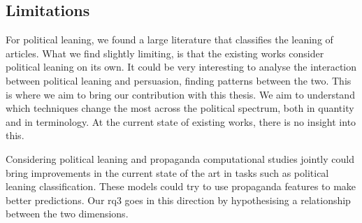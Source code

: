 







\subsection{\statusgreen Limitations}

For political leaning, we found a large literature that
classifies the leaning of articles.
%
What we find slightly limiting, is that the existing works consider political leaning on its own. It could be very interesting to analyse the interaction between political leaning and persuasion, finding patterns between the two. This is where we aim to bring our contribution with this thesis.
We aim to understand which techniques change the most across the political spectrum, both in quantity and in terminology. At the current state of existing works, there is no insight into this.

Considering political leaning and propaganda computational studies jointly could bring improvements in the current state of the art in tasks such as political leaning classification. These models could try to use propaganda features to make better predictions.
Our \acrshort{rq}3 goes in this direction by hypothesising a relationship between the two dimensions.



